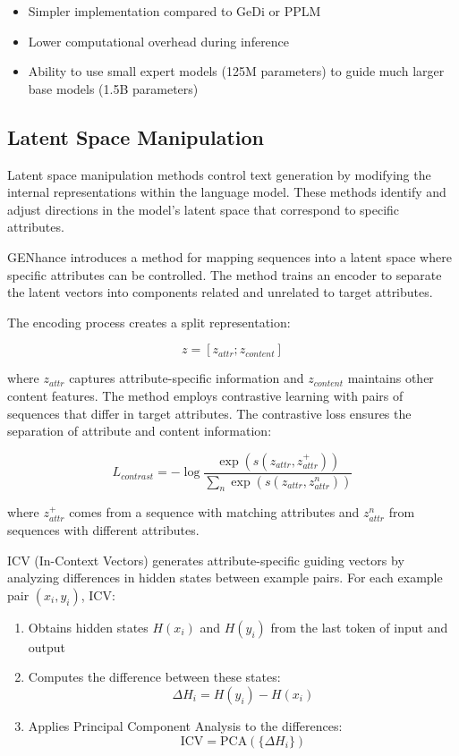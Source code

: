 \begin{itemize}
    \item Simpler implementation compared to GeDi or PPLM
    \item Lower computational overhead during inference
    \item Ability to use small expert models (125M parameters) to guide much larger base models (1.5B parameters)
\end{itemize}

\subsection{Latent Space Manipulation}

Latent space manipulation methods control text generation by modifying the internal representations within the language model. These methods identify and adjust directions in the model's latent space that correspond to specific attributes.

GENhance introduces a method for mapping sequences into a latent space where specific attributes can be controlled. The method trains an encoder to separate the latent vectors into components related and unrelated to target attributes. 

The encoding process creates a split representation:

\begin{equation}
    z = [z_{attr}; z_{content}]
\end{equation}

where $z_{attr}$ captures attribute-specific information and $z_{content}$ maintains other content features. The method employs contrastive learning with pairs of sequences that differ in target attributes. The contrastive loss ensures the separation of attribute and content information:

\begin{equation}
    L_{contrast} = -\log\frac{\exp(s(z_{attr}, z^+_{attr}))}{\sum_{n} \exp(s(z_{attr}, z^n_{attr}))}
\end{equation}

where $z^+_{attr}$ comes from a sequence with matching attributes and $z^n_{attr}$ from sequences with different attributes.

ICV (In-Context Vectors) generates attribute-specific guiding vectors by analyzing differences in hidden states between example pairs. For each example pair $(x_i, y_i)$, ICV:

\begin{enumerate}
    \item Obtains hidden states $H(x_i)$ and $H(y_i)$ from the last token of input and output
    \item Computes the difference between these states:
    \begin{equation}
        \Delta H_i = H(y_i) - H(x_i)
    \end{equation}
    \item Applies Principal Component Analysis to the differences:
    \begin{equation}
        \text{ICV} = \text{PCA}(\{\Delta H_i\})
    \end{equation}
\end{enumerate}

